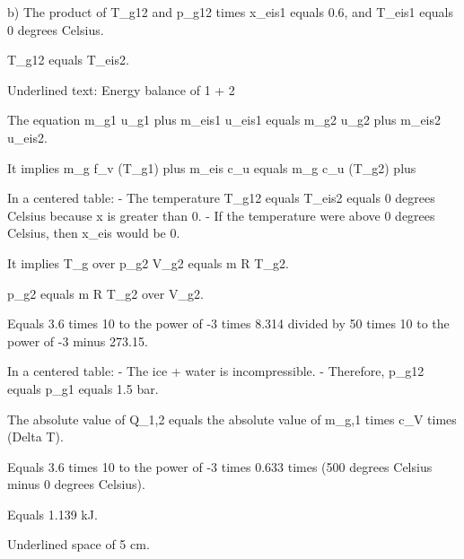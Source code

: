 b) The product of T_g12 and p_g12 times x_eis1 equals 0.6, and T_eis1 equals 0 degrees Celsius.

T_g12 equals T_eis2.

Underlined text: Energy balance of 1 + 2

The equation m_g1 u_g1 plus m_eis1 u_eis1 equals m_g2 u_g2 plus m_eis2 u_eis2.

It implies m_g f_v (T_g1) plus m_eis c_u equals m_g c_u (T_g2) plus

In a centered table:
- The temperature T_g12 equals T_eis2 equals 0 degrees Celsius because x is greater than 0.
- If the temperature were above 0 degrees Celsius, then x_eis would be 0.

It implies T_g over p_g2 V_g2 equals m R T_g2.

p_g2 equals m R T_g2 over V_g2.

Equals 3.6 times 10 to the power of -3 times 8.314 divided by 50 times 10 to the power of -3 minus 273.15.

In a centered table:
- The ice + water is incompressible.
- Therefore, p_g12 equals p_g1 equals 1.5 bar.

The absolute value of Q_1,2 equals the absolute value of m_g,1 times c_V times (Delta T).

Equals 3.6 times 10 to the power of -3 times 0.633 times (500 degrees Celsius minus 0 degrees Celsius).

Equals 1.139 kJ.

Underlined space of 5 cm.